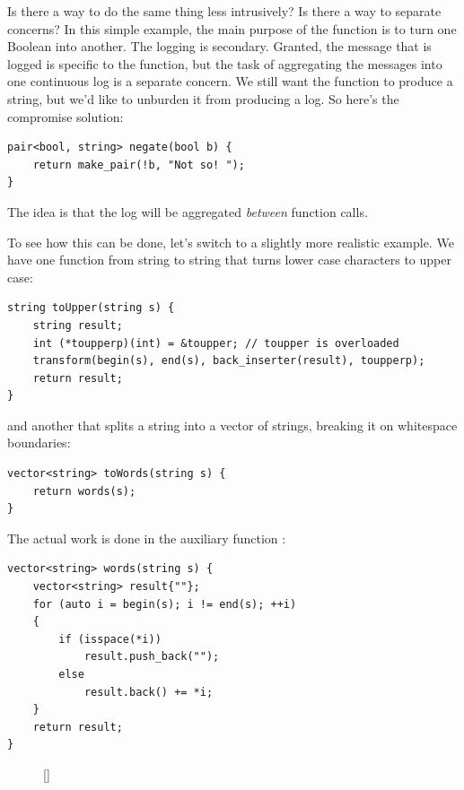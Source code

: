 Is there a way to do the same thing less intrusively? Is there a way to
separate concerns? In this simple example, the main purpose of the
function  is to turn one Boolean into another. The
logging is secondary. Granted, the message that is logged is specific to
the function, but the task of aggregating the messages into one
continuous log is a separate concern. We still want the function to
produce a string, but we'd like to unburden it from producing a log. So
here's the compromise solution:

\begin{Verbatim}[commandchars=\\\{\}]
pair<bool, string> negate(bool b) {
    return make_pair(!b, "Not so! ");
}
\end{Verbatim}
The idea is that the log will be aggregated \emph{between} function
calls.

To see how this can be done, let's switch to a slightly more realistic
example. We have one function from string to string that turns lower
case characters to upper case:

\begin{Verbatim}[commandchars=\\\{\}]
string toUpper(string s) {
    string result;
    int (*toupperp)(int) = &toupper; // toupper is overloaded
    transform(begin(s), end(s), back_inserter(result), toupperp);
    return result;
}
\end{Verbatim}
and another that splits a string into a vector of strings, breaking it
on whitespace boundaries:

\begin{Verbatim}[commandchars=\\\{\}]
vector<string> toWords(string s) {
    return words(s);
}
\end{Verbatim}
The actual work is done in the auxiliary function :

\begin{Verbatim}[commandchars=\\\{\}]
vector<string> words(string s) {
    vector<string> result{""};
    for (auto i = begin(s); i != end(s); ++i)
    {
        if (isspace(*i))
            result.push_back(""); 
        else
            result.back() += *i;
    }
    return result;
}
\end{Verbatim}

\begin{figure}
\raisebox{0pt}[\dimexpr{}\baselineskip\relax]{
}%
\end{figure}

